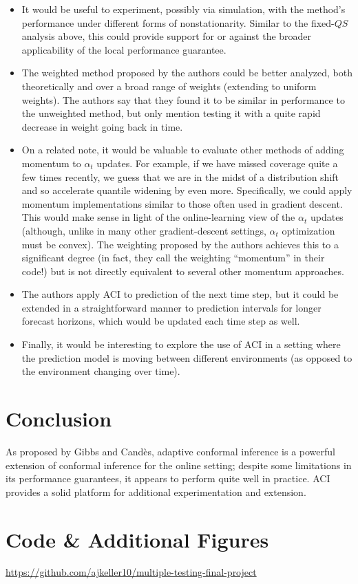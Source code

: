 \documentclass[
]{article}
\providecommand{\tightlist}{%
  \setlength{\itemsep}{0pt}\setlength{\parskip}{0pt}}
\begin{document}
\begin{itemize}
\tightlist
\item
  It would be useful to experiment, possibly via simulation, with the
  method's performance under different forms of nonstationarity. Similar
  to the fixed-\(QS\) analysis above, this could provide support for or
  against the broader applicability of the local performance guarantee.
\item
  The weighted method proposed by the authors could be better analyzed,
  both theoretically and over a broad range of weights (extending to
  uniform weights). The authors say that they found it to be similar in
  performance to the unweighted method, but only mention testing it with
  a quite rapid decrease in weight going back in time.
\item
  On a related note, it would be valuable to evaluate other methods of
  adding momentum to \(\alpha_t\) updates. For example, if we have
  missed coverage quite a few times recently, we guess that we are in
  the midst of a distribution shift and so accelerate quantile widening
  by even more. Specifically, we could apply momentum implementations
  similar to those often used in gradient descent. This would make sense
  in light of the online-learning view of the \(\alpha_t\) updates
  (although, unlike in many other gradient-descent settings,
  \(\alpha_t\) optimization must be convex). The weighting proposed by
  the authors achieves this to a significant degree (in fact, they call
  the weighting ``momentum'' in their code!) but is not directly
  equivalent to several other momentum approaches.
\item
  The authors apply ACI to prediction of the next time step, but it
  could be extended in a straightforward manner to prediction intervals
  for longer forecast horizons, which would be updated each time step as
  well.
\item
  Finally, it would be interesting to explore the use of ACI in a
  setting where the prediction model is moving between different
  environments (as opposed to the environment changing over time).
\end{itemize}

\hypertarget{conclusion}{%
\section{Conclusion}\label{conclusion}}

As proposed by Gibbs and Candès, adaptive conformal inference is a
powerful extension of conformal inference for the online setting;
despite some limitations in its performance guarantees, it appears to
perform quite well in practice. ACI provides a solid platform for
additional experimentation and extension.

\hypertarget{code-additional-figures}{%
\section{Code \& Additional Figures}\label{code-additional-figures}}

\url{https://github.com/ajkeller10/multiple-testing-final-project}
\end{document}
